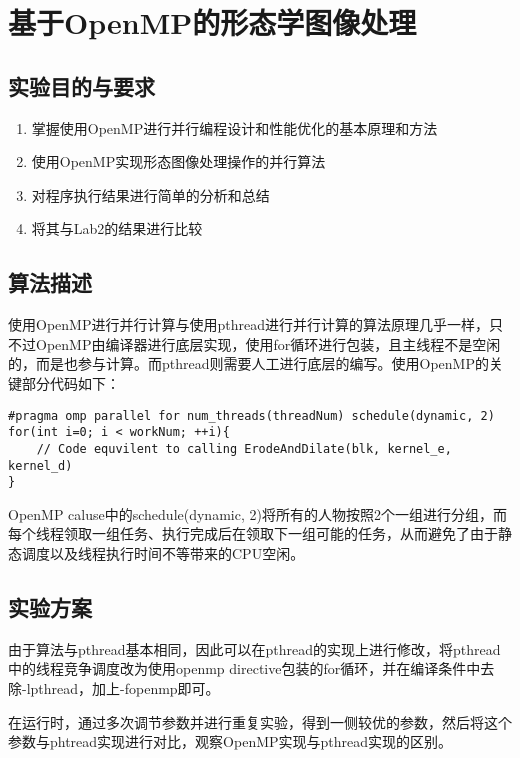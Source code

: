 \chapter{基于OpenMP的形态学图像处理}
\section{实验目的与要求}
\begin{enumerate}
    \item 掌握使用OpenMP进行并行编程设计和性能优化的基本原理和方法
    \item 使用OpenMP实现形态图像处理操作的并行算法
    \item 对程序执行结果进行简单的分析和总结
    \item 将其与Lab2的结果进行比较
\end{enumerate}

\section{算法描述}
\par 使用OpenMP进行并行计算与使用pthread进行并行计算的算法原理几乎一样，只不过OpenMP由编译器进行底层实现，使用for循环进行包装，且主线程不是空闲的，而是也参与计算。而pthread则需要人工进行底层的编写。使用OpenMP的关键部分代码如下：
\begin{lstlisting}
#pragma omp parallel for num_threads(threadNum) schedule(dynamic, 2)
for(int i=0; i < workNum; ++i){
    // Code equvilent to calling ErodeAndDilate(blk, kernel_e, kernel_d)
}
\end{lstlisting}
\par OpenMP caluse中的schedule(dynamic, 2)将所有的人物按照2个一组进行分组，而每个线程领取一组任务、执行完成后在领取下一组可能的任务，从而避免了由于静态调度以及线程执行时间不等带来的CPU空闲。

\section{实验方案}
\par 由于算法与pthread基本相同，因此可以在pthread的实现上进行修改，将pthread中的线程竞争调度改为使用openmp directive包装的for循环，并在编译条件中去除-lpthread，加上-fopenmp即可。
\par 在运行时，通过多次调节参数并进行重复实验，得到一侧较优的参数，然后将这个参数与phtread实现进行对比，观察OpenMP实现与pthread实现的区别。

